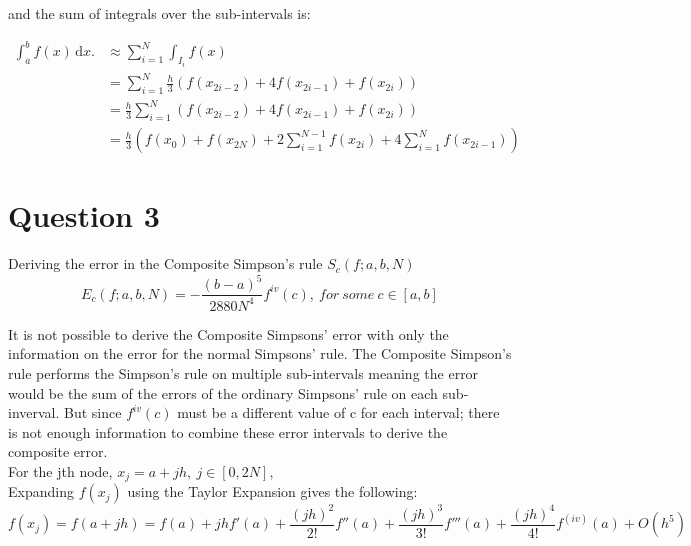 \documentclass[fleqn]{report}
\begin{document}
and the sum of integrals over the sub-intervals is:

\begin{equation*}
\begin{split}
\int_a^b \! f(x) \,\mathrm{d}x. & \approx  \sum_{i=1}^{N} \int_{I_i} \! f(x) \,\\
& = \sum_{i=1}^{N} \frac{h}{3}(f(x_{2i-2}) + 4f(x_{2i-1}) + f(x_{2i}))\\
& = \frac{h}{3} \sum_{i=1}^{N} (f(x_{2i-2}) + 4f(x_{2i-1}) + f(x_{2i}))\\
& = \frac{h}{3} (f(x_0) + f(x_{2N}) +  2\sum_{i=1}^{N-1} f(x_{2i}) + 4\sum_{i=1}^{N} f(x_{2i-1}))
\end{split}
\end{equation*}    

\pagebreak

\section{Question 3}
Deriving the error in the Composite Simpson's rule $S_c(f;a,b,N)$
\begin{equation*}
E_c(f;a,b,N) = -\frac{(b-a)^5}{2880N^4}f^{iv}(c),\ for \ some \ c \in [a,b]
\end{equation*}

\noindent It is not possible to derive the Composite Simpsons' error with only
the information on the error for the normal Simpsons' rule. The Composite
Simpson's rule performs the Simpson's rule on multiple sub-intervals meaning the
error would be the sum of the errors of the ordinary Simpsons' rule on each sub-inverval. 
But since $f^{iv}(c)$ must be a different value of c for each interval;
there is not enough information to combine these error intervals to derive the composite error.\\

\noindent For the jth node, $x_j = a + jh, \ j \in [0, 2N]$, \\
Expanding $f(x_j)$ using the Taylor Expansion gives the following:
\begin{equation}
f(x_j) = f(a + jh) = f(a) + jhf'(a) + \frac{(jh)^2}{2!}f''(a) + \frac{(jh)^3}{3!}f'''(a) + \frac{(jh)^4}{4!}f^{(iv)}(a) + O(h^5)
\end{equation}
\end{document}
